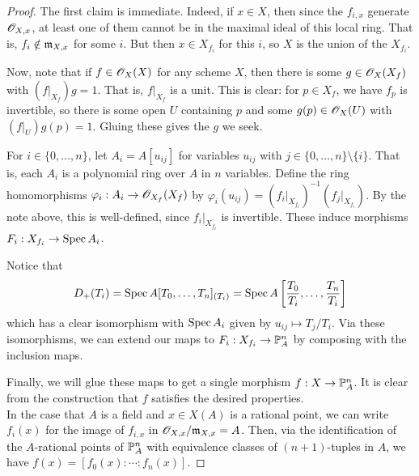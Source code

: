 \begin{proof}
	The first claim is immediate. Indeed, if $x \in X$, then since the $f_{i,x}$ generate $\mathscr{O}_{X,x}$, at least one of them cannot be in the maximal ideal of this local ring. That is, $f_i \notin \mathfrak{m}_{X,x}$ for some $i$. But then $x \in X_{f_i}$ for this $i$, so $X$ is the union of the $X_{f_i}$.
	
	Now, note that if $f \in \mathscr{O}_X(X)$ for any scheme $X$, then there is some $g \in \mathscr{O}_X(X_f)$ with $(f|_{X_f})g = 1$. That is, $f|_{X_f}$ is a unit. This is clear: for $p \in X_f$, we have $f_p$ is invertible, so there is some open $U$ containing $p$ and some $g(p) \in \mathscr{O}_X(U)$ with $(f|_U)g(p) = 1$. Gluing these gives the $g$ we seek.
	
	For $i \in \{0,\ldots,n\}$, let $A_i = A[u_{ij}]$ for variables $u_{ij}$ with $j \in \{0,\ldots,n\} \setminus \{i\}$. That is, each $A_i$ is a polynomial ring over $A$ in $n$ variables. Define the ring homomorphisms $\varphi_i : A_i \to \mathscr{O}_{X_f}(X_f)$ by $\varphi_i(u_{ij}) = (f_i|_{X_{f_i}})^{-1}(f_j|_{X_{f_i}})$. By the note above, this is well-defined, since $f_i|_{X_{f_i}}$ is invertible. These induce morphisms $F_i : X_{f_i} \to \operatorname{Spec} A_i$.
	
	Notice that
	\[ D_{+}(T_i) = \operatorname{Spec} A[T_0,\ldots,T_n]_{(T_i)} = \operatorname{Spec} A\left[\frac{T_0}{T_i},\ldots,\frac{T_n}{T_i}\right] \]
	which has a clear isomorphism with $\operatorname{Spec} A_i$ given by $u_{ij} \mapsto T_j/T_i$. Via these isomorphisms, we can extend our maps to $F_i : X_{f_i} \to \mathbb{P}_A^n$ by composing with the inclusion maps.
	
	Finally, we will glue these maps to get a single morphism $f : X \to \mathbb{P}_A^n$. It is clear from the construction that $f$ satisfies the desired properties. \\
	
	In the case that $A$ is a field and $x \in X(A)$ is a rational point, we can write $f_i(x)$ for the image of $f_{i,x}$ in $\mathscr{O}_{X,x}/\mathfrak{m}_{X,x} = A$. Then, via the identification of the $A$-rational points of $\mathbb{P}_A^n$ with equivalence classes of $(n+1)$-tuples in $A$, we have $f(x) = [f_0(x) : \cdots : f_n(x)]$.
\end{proof}
